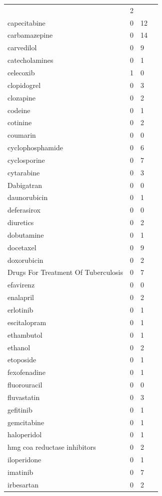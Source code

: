 \documentclass{book}
\begin{document}
\begin{tabularx}{1.3\textwidth}{XXXX}
& 2 \\capecitabine &  0 & 12 \\carbamazepine &  0 & 14 \\carvedilol &  0 & 9 \\catecholamines &  0 & 1 \\celecoxib &  1 & 0 \\clopidogrel &  0 & 3 \\clozapine &  0 & 2 \\codeine &  0 & 1 \\cotinine &  0 & 2 \\coumarin &  0 & 0 \\cyclophosphamide &  0 & 6 \\cyclosporine &  0 & 7 \\cytarabine &  0 & 3 \\Dabigatran &  0 & 0 \\daunorubicin &  0 & 1 \\deferasirox &  0 & 0 \\diuretics &  0 & 2 \\dobutamine &  0 & 1 \\docetaxel &  0 & 9 \\doxorubicin &  0 & 2 \\Drugs For Treatment Of Tuberculosis &  0 & 7 \\efavirenz &  0 & 0 \\enalapril &  0 & 2 \\erlotinib &  0 & 1 \\escitalopram &  0 & 1 \\ethambutol &  0 & 1 \\ethanol &  0 & 2 \\etoposide &  0 & 1 \\fexofenadine &  0 & 1 \\fluorouracil &  0 & 0 \\fluvastatin &  0 & 3 \\gefitinib &  0 & 1 \\gemcitabine &  0 & 1 \\haloperidol &  0 & 1 \\hmg coa reductase inhibitors &  0 & 2 \\iloperidone &  0 & 1 \\imatinib &  0 & 7 \\irbesartan &  0 & 2 
\end{tabularx}
\end{document}

